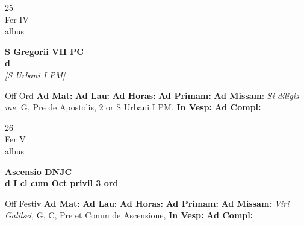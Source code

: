 \documentclass[10pt, openany]{book}
\begin{document}
        \begin{center}
            \begin{minipage}{3.5in}
                \vspace{2em}
                \begin{minipage}{0.5in}
                    {\Huge 25} \\
                    {\normalsize Fer IV} \\
                    {\normalsize albus}
                \end{minipage}
                \begin{minipage}{3.0in}
                    \textbf{ \large S Gregorii VII PC \\
                    \textnormal{\normalsize d}} \\ \textit{[S Urbani I PM]} \\ 
                \end{minipage}
                \begin{justify}Off Ord
                    \textbf{Ad Mat: }
                    \textbf{Ad Lau: }
                    \textbf{Ad Horas: }
                    \textbf{Ad Primam: }\textbf{Ad Missam}: \textit{Si diligis me,} G, Pre de Apostolis, 2 or S Urbani I PM,  
                    \textbf{In Vesp: }
                    \textbf{Ad Compl: }
                \end{justify}
            \end{minipage}
        \end{center}
    
        \begin{center}
            \begin{minipage}{3.5in}
                \vspace{2em}
                \begin{minipage}{0.5in}
                    {\Huge 26} \\
                    {\normalsize Fer V} \\
                    {\normalsize albus}
                \end{minipage}
                \begin{minipage}{3.0in}
                    \textbf{ \large Ascensio DNJC \\
                    \textnormal{\normalsize d I cl cum Oct privil 3 ord}} \\ 
                \end{minipage}
                \begin{justify}Off Festiv
                    \textbf{Ad Mat: }
                    \textbf{Ad Lau: }
                    \textbf{Ad Horas: }
                    \textbf{Ad Primam: }\textbf{Ad Missam}: \textit{Viri Galilæi,} G, C, Pre et Comm de Ascensione,  
                    \textbf{In Vesp: }
                    \textbf{Ad Compl: }
                \end{justify}
            \end{minipage}
        \end{center}
    
\end{document}
